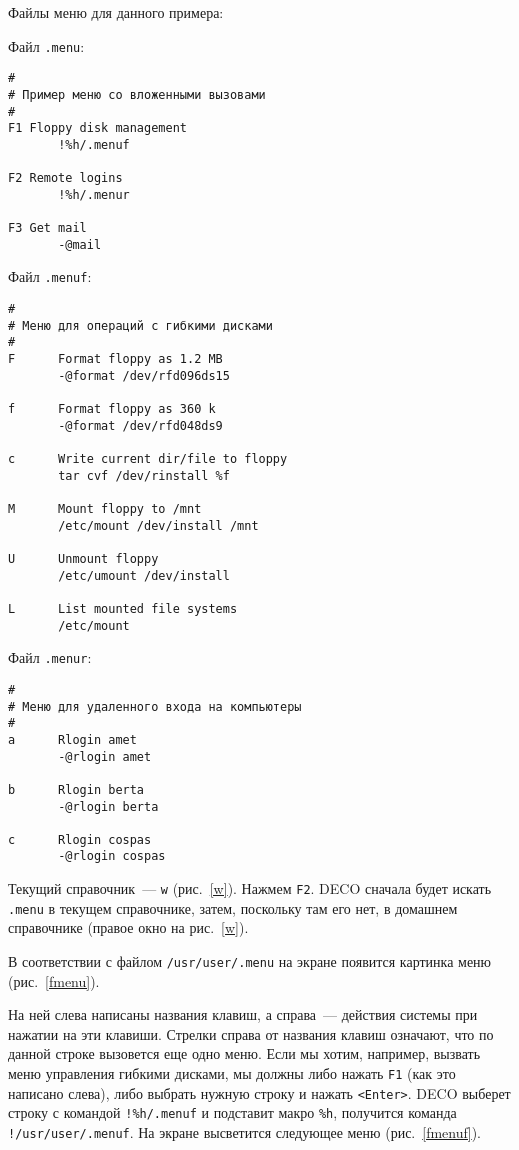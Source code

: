 Файлы меню для данного примера:

Файл {\tt .menu}:
\begin{source}
\begin{verbatim}
#
# Пример меню со вложенными вызовами
#
F1 Floppy disk management
       !%h/.menuf

F2 Remote logins
       !%h/.menur

F3 Get mail
       -@mail
\end{verbatim}
\end{source}

Файл {\tt .menuf}:
\begin{source}
\begin{verbatim}
#
# Меню для операций с гибкими дисками
#
F      Format floppy as 1.2 MB
       -@format /dev/rfd096ds15

f      Format floppy as 360 k
       -@format /dev/rfd048ds9

c      Write current dir/file to floppy
       tar cvf /dev/rinstall %f

M      Mount floppy to /mnt
       /etc/mount /dev/install /mnt

U      Unmount floppy
       /etc/umount /dev/install

L      List mounted file systems
       /etc/mount
\end{verbatim}
\end{source}

Файл {\tt .menur}:
\begin{source}
\begin{verbatim}
#
# Меню для удаленного входа на компьютеры
#
a      Rlogin amet
       -@rlogin amet

b      Rlogin berta
       -@rlogin berta

c      Rlogin cospas
       -@rlogin cospas
\end{verbatim}
\end{source}

Текущий справочник~--- {\tt w} (рис.~\ref{w}).
Нажмем {\tt F2}. DECO сначала будет искать {\tt .menu} в
текущем справочнике, затем, поскольку там его нет,
в домашнем справочнике (правое окно на рис.~\ref{w}).


В соответствии с файлом {\tt /usr/user/.menu} на экране
появится картинка меню (рис.~\ref{fmenu}).


На ней слева написаны названия клавиш, а справа~--- действия системы
при нажатии на эти клавиши.
Стрелки справа от названия клавиш означают, что по данной строке
вызовется еще одно меню.
Если мы хотим, например, вызвать меню управления гибкими дисками,
мы должны либо нажать {\tt F1} (как это написано слева), либо
выбрать нужную строку и нажать {\tt <Enter>}.
DECO выберет строку с командой {\tt !\%h/.menuf} и подставит макро {\tt \%h},
получится команда {\tt !/usr/user/.menuf}. На экране
высветится следующее меню (рис.~\ref{fmenuf}).


